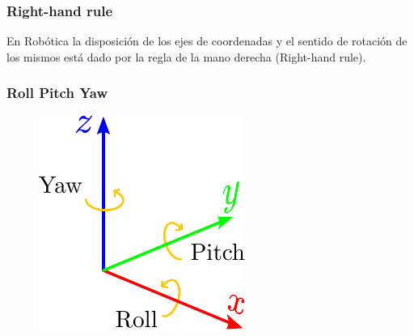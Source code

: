\begin{frame}
    \frametitle{Right-hand rule}
    En Robótica la disposición de los ejes de coordenadas y el sentido de rotación de los mismos está dado por la regla de la mano derecha (Right-hand rule).
    
    \begin{figure}[!h]
        \centering
        \hspace{1cm}
    \end{figure}
\end{frame}

\begin{frame}
    \frametitle{Roll Pitch Yaw }
    
    \begin{figure}[!h]
        \includegraphics[width=0.4\columnwidth]{./images/roll_pitch_yaw.pdf}
    \end{figure}
\end{frame}

